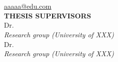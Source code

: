 
\thispagestyle{empty}

\noindent\hspace*{\centeroffset}\begin{minipage}{\textwidth}

\centering

\vspace{3.5cm}

{\LARGE \textbf{\myTitle} \\ } 
\vspace{1cm}

\end{minipage}

\vspace{1cm}
\noindent\hspace*{\centeroffset}\begin{minipage}{\textwidth}
\centering

{\Large  \myName}\\ [0.2cm]
{\selectfont
\href{mailto:aaaaa@edu.com}{aaaaa@edu.com}
} \\ [2.5cm]


\textbf{THESIS SUPERVISORS}\\[0.3cm]
{Dr. \myProf\\ [0.1cm]
{\small \textit{Research group (University of XXX)}} \\[0.3cm]
Dr. \myOtherProf\\ [0.1cm]
{\small \textit{Research group (University of XXX)}} \\ 
}
		
\end{minipage}


